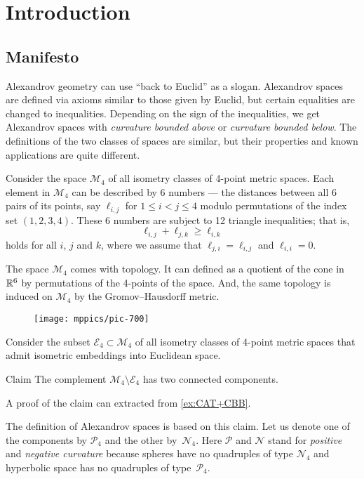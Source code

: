 \chapter{Introduction}

\section{Manifesto}

Alexandrov geometry can use ``back to Euclid'' as a slogan.
Alexandrov spaces are defined via axioms similar to those given by Euclid,
but certain  equalities are changed to inequalities. 
Depending on the sign of the inequalities, we get Alexandrov spaces with {}\emph{curvature bounded above} or {}\emph{curvature bounded below}.
The definitions of the two classes of spaces are similar, but their properties and known applications are quite different.


Consider the space $\mathcal{M}_4$ of all isometry classes of 4-point metric spaces.
Each element in $\mathcal{M}_4$ can be described by 6 numbers 
 --- the distances between all 6 pairs of its points, say $\ell_{i,j}$ for $1\le i< j\le 4$ modulo permutations of the index set $(1,2,3,4)$.
These 6 numbers are subject to 12 triangle inequalities; that is,
\[\ell_{i,j}+\ell_{j,k}\ge \ell_{i,k}\]
holds for all $i$, $j$ and $k$, where we assume that $\ell_{j,i}=\ell_{i,j}$ and $\ell_{i,i}=0$.

The space $\mathcal{M}_4$ comes with topology.
It can defined as a quotient of the cone in $\mathbb{R}^6$ by permutations of the 4-points of the space.
And, the same topology is induced on $\mathcal{M}_4$ by the Gromov--Hausdorff metric.

\begin{wrapfigure}[7]{o}{33mm}
\vskip-0mm
\centering
\texttt{[image: mppics/pic-700]}
\end{wrapfigure}

Consider the subset $\mathcal{E}_4\subset \mathcal{M}_4$ of all isometry classes of 4-point metric spaces that admit isometric embeddings into Euclidean space.

\begin{thm}{Claim}\label{clm:two-components-of-M4}
The complement $\mathcal{M}_4\setminus \mathcal{E}_4$ has two connected components.
\end{thm}

A proof of the claim can extracted from \ref{ex:CAT+CBB}.

The definition of Alexandrov spaces is based on this claim.
Let us denote one of the components by $\mathcal{P}_4$ and the other by~$\mathcal{N}_4$.
Here $\mathcal{P}$ and $\mathcal{N}$ stand for {}\emph{positive} 
and {}\emph{negative curvature} because spheres have no quadruples of type $\mathcal{N}_4$ and 
hyperbolic space
has no quadruples of type~$\mathcal{P}_4$.

